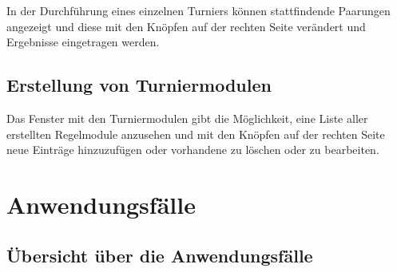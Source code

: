 \documentclass[11pt]{article}
\begin{document}
\vspace{1cm}

In der Durchführung eines einzelnen Turniers können stattfindende Paarungen angezeigt und diese mit den Knöpfen auf der rechten Seite verändert und Ergebnisse eingetragen werden.

\subsection{Erstellung von Turniermodulen}


\vspace{1cm}

Das Fenster mit den Turniermodulen gibt die Möglichkeit, eine Liste aller erstellten Regelmodule anzusehen und mit den Knöpfen auf der rechten Seite neue Einträge hinzuzufügen oder vorhandene zu löschen oder zu bearbeiten.

\section{Anwendungsfälle}

\subsection{Übersicht über die Anwendungsfälle}
\end{document}
